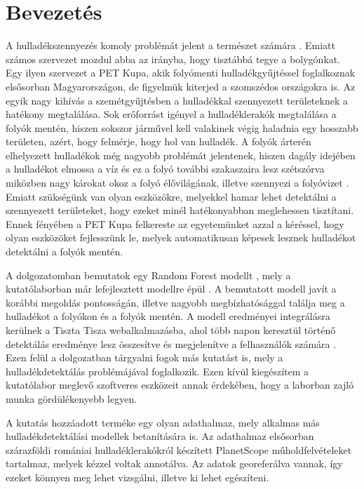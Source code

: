 \chapter{Bevezetés}
\label{ch:intro}

A hulladékszennyezés komoly problémát jelent a természet számára \cite{kibria2023PlasticWaste}. Emiatt számos szervezet mozdul abba az irányba, hogy tisztábbá tegye a bolygónkat. Egy ilyen szervezet a PET Kupa, akik folyómenti hulladékgyűjtéssel foglalkoznak elsősorban Magyarországon, de figyelmük kiterjed a szomszédos országokra is. Az egyik nagy kihívás a szemétgyűjtésben a hulladékkal szennyezett területeknek a hatékony megtalálása. Sok erőforrást igényel a hulladéklerakók megtalálása a folyók mentén, hiszen sokszor járművel kell valakinek végig haladnia egy hosszabb területen, azért, hogy felmérje, hogy hol van hulladék. A folyók árterén elhelyezett hulladékok még nagyobb problémát jelentenek, hiszen dagály idejében a hulladékot elmossa a víz és ez a folyó további szakaszaira lesz szétszórva miközben nagy károkat okoz a folyó élővilágának, illetve szennyezi a folyóvizet \cite{nyberg2023, vanEmmerik2023}. Emiatt szükségünk van olyan eszközökre, melyekkel hamar lehet detektálni a szennyezett területeket, hogy ezeket minél hatékonyabban meglehessen tisztítani. Ennek fényében a PET Kupa felkereste az egyetemünket azzal a kéréssel, hogy olyan eszközöket fejlesszünk le, melyek automatikusan képesek lesznek hulladékot detektálni a folyók mentén.

A dolgozatomban bemutatok egy Random Forest modellt \cite{breiman2001}, mely a kutatólaborban már lefejlesztett modellre épül \cite{magyar2023}. A bemutatott modell javít a korábbi megoldás pontosságán, illetve nagyobb megbízhatósággal találja meg a hulladékot a folyókon és a folyók mentén. A modell eredményei integrálásra kerülnek a Tiszta Tisza webalkalmazásba, ahol több napon keresztül történő detektálás eredménye lesz összesítve és megjelenítve a felhasználók számára . Ezen felül a dolgozatban tárgyalni fogok más kutatást is, mely a hulladékdetektálás problémájával foglalkozik. Ezen kívül kiegészítem a kutatólabor meglevő szoftveres eszközeit annak érdekében, hogy a laborban zajló munka gördülékenyebb legyen.

A kutatás hozzáadott terméke egy olyan adathalmaz, mely alkalmas más hulladékdetektálási modellek betanítására is. Az adathalmaz elsősorban szárazföldi romániai hulladéklerakókról készített PlanetScope műholdfelvételeket tartalmaz, melyek kézzel voltak annotálva. Az adatok georeferálva vannak, így ezeket könnyen meg lehet vizsgálni, illetve ki lehet egészíteni.

